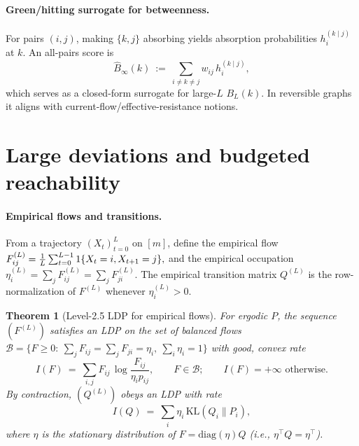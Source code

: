 \documentclass[11pt]{article}
\newcommand{\1}{\mathbbm{1}}
\newcommand{\KL}{\mathrm{KL}}
\newcommand{\diag}{\mathrm{diag}}
\theoremstyle{plain}
\newtheorem{theorem}{Theorem}
\theoremstyle{definition}
\begin{document}
\paragraph{Green/hitting surrogate for betweenness.}
For pairs $(i,j)$, making $\{k,j\}$ absorbing yields absorption probabilities $h_i^{(k\mid j)}$ at $k$. An all-pairs score is
\begin{equation}
\label{eq:green-betweenness}
\widehat B_\infty(k)\ :=\ \sum_{i\neq k\neq j} w_{ij}\, h_i^{(k\mid j)},
\end{equation}
which serves as a closed-form surrogate for large-$L$ $B_L(k)$. In reversible graphs it aligns with current-flow/effective-resistance notions.

\section{Large deviations and budgeted reachability}
\label{sec:ld}

\paragraph{Empirical flows and transitions.}
From a trajectory $(X_t)_{t=0}^{L}$ on $[m]$, define the empirical flow
\(
F_{ij}^{(L)}=\frac1L\sum_{t=0}^{L-1}\1\{X_t=i,X_{t+1}=j\},
\)
and the empirical occupation $\eta_i^{(L)}=\sum_j F_{ij}^{(L)}=\sum_j F_{ji}^{(L)}$. The empirical transition matrix $Q^{(L)}$ is the row-normalization of $F^{(L)}$ whenever $\eta_i^{(L)}>0$.

\begin{theorem}[Level-2.5 LDP for empirical flows]
\label{thm:l25}
For ergodic $P$, the sequence $(F^{(L)})$ satisfies an LDP on the set of balanced flows
\(
\mathcal B=\{F\ge0:\ \sum_j F_{ij}=\sum_j F_{ji}=\eta_i,\ \sum_i \eta_i=1\}
\)
with good, convex rate
\begin{equation}
\label{eq:l25-rate}
I(F)\ =\ \sum_{i,j} F_{ij}\,\log\frac{F_{ij}}{\eta_i p_{ij}},\qquad F\in\mathcal B;\qquad I(F)=+\infty\text{ otherwise.}
\end{equation}
By contraction, $(Q^{(L)})$ obeys an LDP with rate
\begin{equation}
\label{eq:Q-rate}
I(Q)\ =\ \sum_i \eta_i\,\KL(Q_i\|P_i),
\end{equation}
where $\eta$ is the stationary distribution of $F=\diag(\eta)Q$ (i.e., $\eta^\top Q=\eta^\top$).
\end{theorem}
\end{document}
